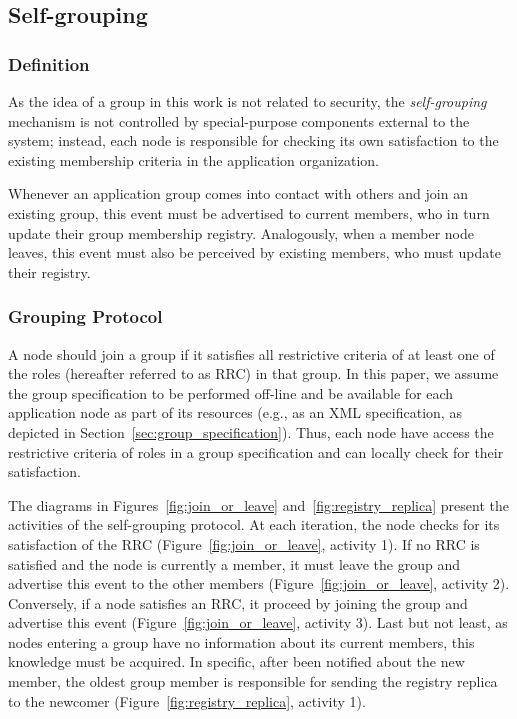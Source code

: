 \subsection{Self-grouping} 


\subsubsection{\textbf{Definition}} As the idea of a group in this work is not related to security, the \textit{self-grouping} mechanism is not controlled by special-purpose components external to the system; instead, each node is responsible for checking its own satisfaction to the existing membership criteria in the application organization. 

Whenever an application group comes into contact with others and join an existing group, this event must be  advertised to current members, who in turn update their group membership registry. Analogously, when a member node leaves, this event must also be perceived by existing members, who must update their registry.

\subsubsection{\textbf{Grouping Protocol}} 

A node should join a group if it satisfies all restrictive criteria of at least one of the roles (hereafter referred to as RRC) in that group. In this paper, we assume the group specification to be performed off-line and be available for each application node as part of its resources (e.g., as an XML specification, as depicted in Section~\ref{sec:group_specification}). Thus, each node have access the restrictive criteria of roles in a group specification and can locally check for their satisfaction. 



The diagrams in Figures~\ref{fig:join_or_leave} and~\ref{fig:registry_replica} present the activities of the self-grouping protocol. At each iteration, the node checks for its satisfaction of the RRC (Figure~\ref{fig:join_or_leave}, activity 1). If no RRC is satisfied and the node is currently a member, it must leave the group and advertise this event to the other members (Figure~\ref{fig:join_or_leave}, activity 2). Conversely, if a node satisfies an RRC, it proceed by joining the group and advertise this event (Figure~\ref{fig:join_or_leave}, activity 3). Last but not least, as nodes entering a group have no information about its current members, this knowledge must be acquired. In specific, after been notified about the new member, the oldest group member is responsible for sending the registry replica to the newcomer (Figure~\ref{fig:registry_replica}, activity 1).

